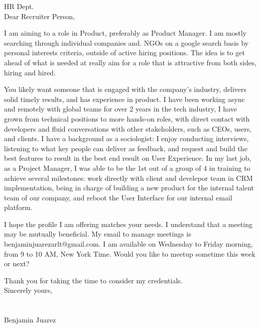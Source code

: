 HR Dept.\\

Dear Recruiter Person,

I am aiming to a role in Product, preferably as Product Manager. I am
mostly searching through individual companies and. NGOs on a google
search basis by personal interests criteria, outside of active hiring
positions. The idea is to get ahead of what is needed at really aim for
a role that is attractive from both sides, hiring and hired.

You likely want someone that is engaged with the company's industry,
delivers solid timely results, and has experience in product. I have
been working async and remotely with global teams for over 2 years in
the tech industry, I have grown from technical positions to more
hands-on roles, with direct contact with developers and fluid
conversations with other stakeholders, such as CEOs, users, and clients.
I have a background as a sociologist: I enjoy conducting interviews,
listening to what key people can deliver as feedback, and request and
build the best features to result in the best end result on User
Experience. In my last job, as a Project Manager, I was able to be the
1st out of a group of 4 in training to achieve several milestones: work
directly with client and develepor team in CRM implementation, being in
charge of building a new product for the internal talent team of our
company, and reboot the User Interface for our internal email platform.

I hope the profile I am offering matches your needs. I understand that a
meeting may be mutually beneficial. My email to manage meetings is
benjaminjuarezarlt@gmail.com. I am available on Wednesday to Friday
morning, from 9 to 10 AM, New York Time. Would you like to meetup
sometime this week or next?

Thank you for taking the time to consider my credentials.\\
Sincerely yours,\\
~\\
~\\
Benjamin Juarez
